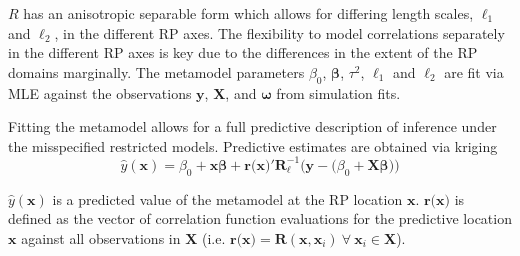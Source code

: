 \documentclass[12pt]{article}
\begin{document}
$R$ has an anisotropic separable form which allows for differing length scales, 
$\ell_1$ and $\ell_2$, in the different RP axes. The flexibility to model 
correlations separately in the different RP axes is key due to the differences 
in the extent of the RP domains marginally. 
The metamodel parameters $\beta_0$, $\bm{\beta}$, $\tau^2$,
$\ell_1$ and $\ell_2$ are fit via MLE against the observations $\textbf{y}$, $\bm{X}$,
and $\bm{\omega}$ from simulation fits.

%
Fitting the metamodel allows for a full predictive description of inference 
under the misspecified restricted models.
Predictive estimates are obtained via kriging  %
\begin{equation} %
	\hat y(\textbf{x}) = \beta_0 + \textbf{x}\bm{\beta} + \textbf{r(x)}'\bm{R}^{-1}_{\bm{\ell}}\Big(\textbf{y}-\big(\beta_0+\bm{X}\bm{\beta}\big)\Big)
\end{equation}

%
$\hat y(\textbf{x})$ is a predicted value of the metamodel at the 
RP location $\textbf{x}$. $\textbf{r(x)}$ is defined as the vector of correlation 
function evaluations for the predictive location $\textbf{x}$ against all observations 
in $\bm{X}$ (i.e. $\textbf{r(x)}=\bm{R}(\textbf{x}, \bm{x}_i)~\forall~\bm{x}_i\in\bm{X}$).

%

%
%
%
%
%
%
%
%
\end{document}
